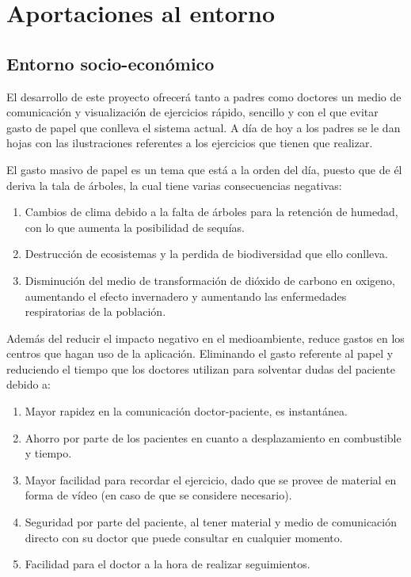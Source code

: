 \section{Aportaciones al entorno}
\subsection{Entorno socio-económico}
El desarrollo de este proyecto ofrecerá tanto a padres como doctores un medio de comunicación
y visualización de ejercicios rápido, sencillo y con el que evitar gasto de papel que conlleva
el sistema actual. A día de hoy a los padres se le dan hojas con las ilustraciones referentes
a los ejercicios que tienen que realizar.

\medskip
El gasto masivo de papel es un tema que está a la orden del día, puesto que de él deriva la
tala de árboles, la cual tiene varias consecuencias negativas:
\begin{enumerate}
    \item Cambios de clima debido a la falta de árboles para la retención de humedad, con lo que aumenta la posibilidad de sequías.
    \item Destrucción de ecosistemas y la perdida de biodiversidad que ello conlleva.
    \item Disminución del medio de transformación de dióxido de carbono en oxigeno, aumentando el efecto invernadero y aumentando las enfermedades respiratorias de la población.
\end{enumerate}

\bigskip
Además del reducir el impacto negativo en el medioambiente, reduce gastos en los centros
que hagan uso de la aplicación. Eliminando el gasto referente al papel y reduciendo el
tiempo que los doctores utilizan para solventar dudas del paciente debido a:
\begin{enumerate}
    \item Mayor rapidez en la comunicación doctor-paciente, es instantánea.
    \item Ahorro por parte de los pacientes en cuanto a desplazamiento en combustible y tiempo.
    \item Mayor facilidad para recordar el ejercicio, dado que se provee de material en forma de vídeo (en caso de que se considere necesario).
    \item Seguridad por parte del paciente, al tener material y medio de comunicación directo con su doctor que puede consultar en cualquier momento.
    \item Facilidad para el doctor a la hora de realizar seguimientos.
\end{enumerate}

